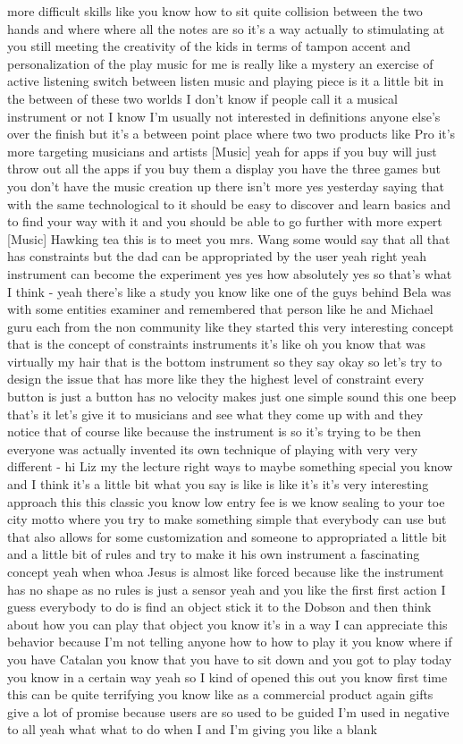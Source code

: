 more difficult skills like you know how to sit quite collision between the two hands and where where all the notes are so it's a way actually to stimulating at you still meeting the creativity of the kids in terms of tampon accent and personalization of the play music for me is really like a mystery an exercise of active listening switch between listen music and playing piece is it a little bit in the between of these two worlds I don't know if people call it a musical instrument or not I know I'm usually not interested in definitions anyone else's over the finish but it's a between point place where two two products like Pro it's more targeting musicians and artists [Music] yeah for apps if you buy will just throw out all the apps if you buy them a display you have the three games but you don't have the music creation up there isn't more yes yesterday saying that with the same technological to it should be easy to discover and learn basics and to find your way with it and you should be able to go further with more expert [Music] Hawking tea this is to meet you mrs. Wang some would say that all that has constraints but the dad can be appropriated by the user yeah right yeah instrument can become the experiment yes yes how absolutely yes so that's what I think - yeah there's like a study you know like one of the guys behind Bela was with some entities examiner and remembered that person like he and Michael guru each from the non community like they started this very interesting concept that is the concept of constraints instruments it's like oh you know that was virtually my hair that is the bottom instrument so they say okay so let's try to design the issue that has more like they the highest level of constraint every button is just a button has no velocity makes just one simple sound this one beep that's it let's give it to musicians and see what they come up with and they notice that of course like because the instrument is so it's trying to be then everyone was actually invented its own technique of playing with very very different - hi Liz my the lecture right ways to maybe something special you know and I think it's a little bit what you say is like is like it's it's very interesting approach this this classic you know low entry fee is we know sealing to your toe city motto where you try to make something simple that everybody can use but that also allows for some customization and someone to appropriated a little bit and a little bit of rules and try to make it his own instrument a fascinating concept yeah when whoa Jesus is almost like forced because like the instrument has no shape as no rules is just a sensor yeah and you like the first first action I guess everybody to do is find an object stick it to the Dobson and then think about how you can play that object you know it's in a way I can appreciate this behavior because I'm not telling anyone how to how to play it you know where if you have Catalan you know that you have to sit down and you got to play today you know in a certain way yeah so I kind of opened this out you know first time this can be quite terrifying you know like as a commercial product again gifts give a lot of promise because users are so used to be guided I'm used in negative to all yeah what what to do when I and I'm giving you like a blank 